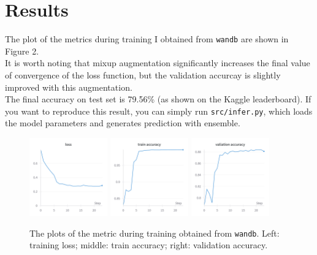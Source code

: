\documentclass{article}
\begin{document}
    \section{Results}
    The plot of the metrics during training I obtained from \texttt{wandb} are shown in Figure 2.\\
    It is worth noting that mixup augmentation significantly increases the final value of convergence of the loss function, but the validation accurcay is slightly improved with this augmentation.\\
    The final accuracy on test set is 79.56\% (as shown on the Kaggle leaderboard). If you want to reproduce this result, you can simply run \texttt{src/infer.py}, which loads the model parameters and generates prediction with ensemble.
    \newpage{}
    \begin{figure}[hbt!]
        \centering
        \includegraphics[width=0.3\textwidth]{figs/loss.png}
        \includegraphics[width=0.3\textwidth]{figs/train.png}
        \includegraphics[width=0.3\textwidth]{figs/val.png}
        \caption{The plots of the metric during training obtained from \texttt{wandb}. Left: training loss; middle: train accuracy; right: validation accuracy.}
    \end{figure}
\end{document}
